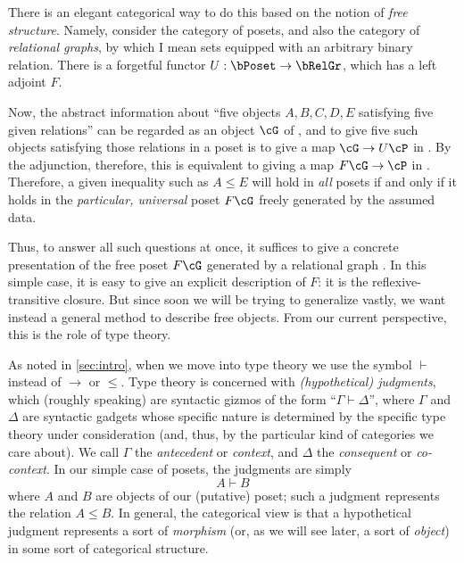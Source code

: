 \documentclass{book}
\let\types\vdash
\begin{document}
There is an elegant categorical way to do this based on the notion of \emph{free structure}.
Namely, consider the category \bPoset of posets, and also the category \bRelGr of \emph{relational graphs}, by which I mean sets equipped with an arbitrary binary relation.
There is a forgetful functor $U:\bPoset \to \bRelGr$, which has a left adjoint $F$.

Now, the abstract information about ``five objects $A,B,C,D,E$ satisfying five given relations'' can be regarded as an object $\cG$ of \bRelGr, and to give five such objects satisfying those relations in a poset \cP is to give a map $\cG \to U\cP$ in \bRelGr.
By the adjunction, therefore, this is equivalent to giving a map $F\cG \to \cP$ in \bPoset.
Therefore, a given inequality such as $A\le E$ will hold in \emph{all} posets if and only if it holds in the \emph{particular, universal} poset $F\cG$ freely generated by the assumed data.

Thus, to answer all such questions at once, it suffices to give a concrete presentation of the free poset $F\cG$ generated by a relational graph \cG.
In this simple case, it is easy to give an explicit description of $F$: it is the reflexive-transitive closure.
But since soon we will be trying to generalize vastly, we want instead a general method to describe free objects.
From our current perspective, this is the role of type theory.

As noted in \cref{sec:intro}, when we move into type theory we use the symbol $\types$ instead of $\to$ or $\le$.
Type theory is concerned with \emph{(hypothetical) judgments}, which (roughly speaking) are syntactic gizmos of the form ``$\Gamma\types\Delta$'', where $\Gamma$ and $\Delta$ are syntactic gadgets whose specific nature is determined by the specific type theory under consideration (and, thus, by the particular kind of categories we care about).
We call $\Gamma$ the \emph{antecedent} or \emph{context}, and $\Delta$ the \emph{consequent} or \emph{co-context}.
In our simple case of posets, the judgments are simply
\[ A \types B \]
where $A$ and $B$ are objects of our (putative) poset; such a judgment represents the relation $A\le B$.
In general, the categorical view is that a hypothetical judgment represents a sort of \emph{morphism} (or, as we will see later, a sort of \emph{object}) in some sort of categorical structure.
\end{document}

